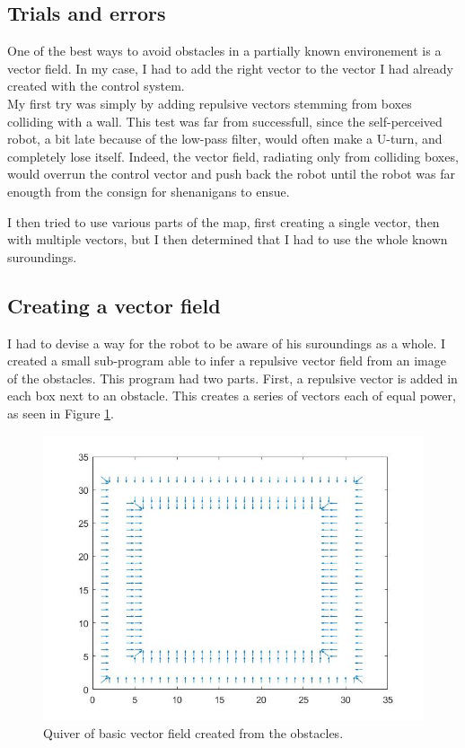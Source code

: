 \subsection{Trials and errors}

One of the best ways to avoid obstacles in a partially known environement is a vector field.
In my case, I had to add the right vector to the vector I had already created with the control system.\\

My first try was simply by adding repulsive vectors stemming from boxes colliding with a wall.
This test was far from successfull, since the self-perceived robot, a bit late because of the low-pass filter, would often make a U-turn, and completely lose itself.
Indeed, the vector field, radiating only from colliding boxes, would overrun the control vector and push back the robot until the robot was far enougth from the consign for shenanigans to ensue.

I then tried to use various parts of the map, first creating a single vector, then with multiple vectors, but I then determined that I had to use the whole known suroundings.

\subsection{Creating a vector field}
\label{vectf}

I had to devise a way for the robot to be aware of his suroundings as a whole.
 I created a small sub-program able to infer a repulsive vector field from an image of the obstacles.
 This program had two parts. First, a repulsive vector is added in each box next to an obstacle.
 This creates a series of vectors each of equal power, as seen in Figure \ref{fig:quiver1}.\\

 \begin{figure}[ht]
 \centering
 \includegraphics[scale=0.4]{Figures/quiver1}
 \decoRule
 \caption[Basic Quiver]{Quiver of basic vector field created from the obstacles.}
 \label{fig:quiver1}
 \end{figure}

